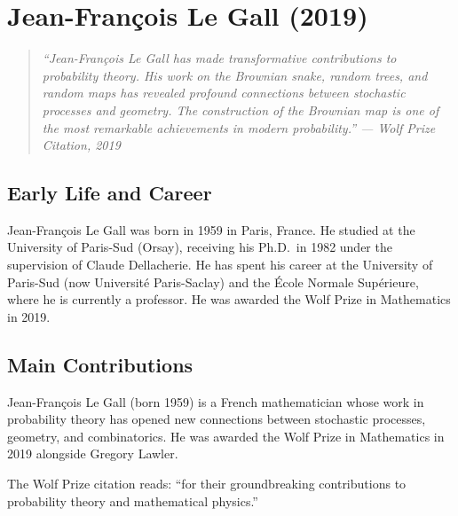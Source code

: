
\chapter{Jean-Fran\c{c}ois Le Gall (2019)}

\begin{quote}
\it ``Jean-Fran\c cois Le Gall has made transformative contributions to probability theory. His work on the Brownian snake, random trees, and random maps has revealed profound connections between stochastic processes and geometry. The construction of the Brownian map is one of the most remarkable achievements in modern probability.'' --- Wolf Prize Citation, 2019
\end{quote}

\section{Early Life and Career}

Jean-Fran\c{c}ois Le Gall was born in 1959 in Paris, France. He studied at the University of Paris-Sud (Orsay), receiving his Ph.D.\ in 1982 under the supervision of Claude Dellacherie. He has spent his career at the University of Paris-Sud (now Universit\'{e} Paris-Saclay) and the \'Ecole Normale Sup\'{e}rieure, where he is currently a professor. He was awarded the Wolf Prize in Mathematics in 2019.

\section{Main Contributions}

Jean-Fran\c{c}ois Le Gall (born 1959) is a French mathematician whose work in probability theory has opened new connections between stochastic processes, geometry, and combinatorics. He was awarded the Wolf Prize in Mathematics in 2019 alongside Gregory Lawler.

The Wolf Prize citation reads: ``for their groundbreaking contributions to probability theory and mathematical physics.''

